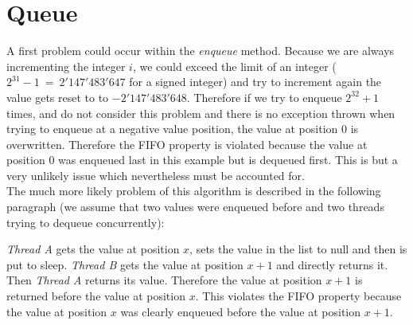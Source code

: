 \documentclass{article}
\begin{document}
    \section{Queue}
    \begin{adjustwidth}{2em}{2em}
    	A first problem could occur within the \textit{enqueue} method. Because we are always incrementing the integer $i$, we could exceed the limit of an integer ($2^{31} - 1 \ = \ 2'147'483'647$ for a signed integer) and try to increment again the value gets reset to to $-2'147'483'648$. Therefore if we try to enqueue $2^{32} + 1$ times, and do not consider this problem and there is no exception thrown when trying to enqueue at a negative value position, the value at position $0$ is overwritten. Therefore the FIFO property is violated because the value at position $0$ was enqueued last in this example but is dequeued first. This is but a very unlikely issue which nevertheless must be accounted for. \\
    	The much more likely problem of this algorithm is described in the following paragraph (we assume that two values were enqueued before and two threads trying to dequeue concurrently): \\
    	\begin{center}
    		\textit{Thread A} gets the value at position $x$, sets the value in the list to null and then is put to sleep. \textit{Thread B} gets the value at position $x+1$ and directly returns it. Then \textit{Thread A} returns its value. Therefore the value at position $x+1$ is returned before the value at position $x$. This violates the FIFO property because the value at position $x$ was clearly enqueued before the value at position $x+1$.
    	\end{center}
    \end{adjustwidth}    
\end{document}
